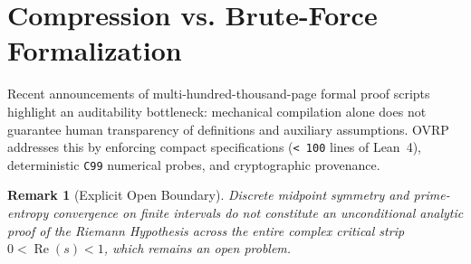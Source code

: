 \documentclass[11pt,a4paper]{article}
\newtheorem{remark}{Remark}
\begin{document}
\section{Compression vs. Brute-Force Formalization}
Recent announcements of multi-hundred-thousand-page formal proof scripts highlight an auditability bottleneck: mechanical compilation alone does not guarantee human transparency of definitions and auxiliary assumptions. OVRP addresses this by enforcing compact specifications (\texttt{< 100} lines of Lean~4), deterministic \texttt{C99} numerical probes, and cryptographic provenance.

\begin{remark}[Explicit Open Boundary]
Discrete midpoint symmetry and prime-entropy convergence on finite intervals do not constitute an unconditional analytic proof of the Riemann Hypothesis across the entire complex critical strip $0 < \operatorname{Re}(s) < 1$, which remains an open problem.
\end{remark}
\end{document}
